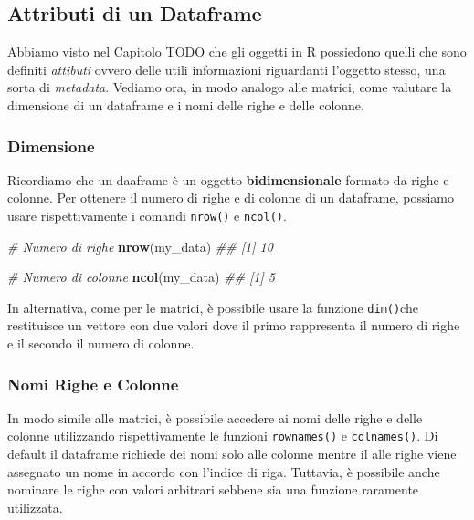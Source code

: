 \documentclass[
]{book}
\newenvironment{Shaded}{\begin{snugshade}}{\end{snugshade}}
\newcommand{\CommentTok}[1]{\textcolor[rgb]{0.56,0.35,0.01}{\textit{#1}}}
\newcommand{\KeywordTok}[1]{\textcolor[rgb]{0.13,0.29,0.53}{\textbf{#1}}}
\newcommand{\NormalTok}[1]{#1}
\begin{document}
\hypertarget{mat-prop}{%
\subsection{Attributi di un Dataframe}\label{mat-prop}}

Abbiamo visto nel Capitolo TODO che gli oggetti in R possiedono quelli che sono definiti \emph{attibuti} ovvero delle utili informazioni riguardanti l'oggetto stesso, una sorta di \emph{metadata}. Vediamo ora, in modo analogo alle matrici, come valutare la dimensione di un dataframe e i nomi delle righe e delle colonne.

\hypertarget{dimensione-1}{%
\subsubsection*{Dimensione}\label{dimensione-1}}

Ricordiamo che un daaframe è un oggetto \textbf{bidimensionale} formato da righe e colonne. Per ottenere il numero di righe e di colonne di un dataframe, possiamo usare rispettivamente i comandi \texttt{nrow()} e \texttt{ncol()}.

\begin{Shaded}
\begin{Highlighting}[]
\CommentTok{# Numero di righe}
\KeywordTok{nrow}\NormalTok{(my_data)}
\CommentTok{## [1] 10}

\CommentTok{# Numero di colonne}
\KeywordTok{ncol}\NormalTok{(my_data)}
\CommentTok{## [1] 5}
\end{Highlighting}
\end{Shaded}

In alternativa, come per le matrici, è possibile usare la funzione \texttt{dim()}che restituisce un vettore con due valori dove il primo rappresenta il numero di righe e il secondo il numero di colonne.

\hypertarget{nomi-righe-e-colonne-1}{%
\subsubsection*{Nomi Righe e Colonne}\label{nomi-righe-e-colonne-1}}

In modo simile alle matrici, è possibile accedere ai nomi delle righe e delle colonne utilizzando rispettivamente le funzioni \texttt{rownames()} e \texttt{colnames()}. Di default il dataframe richiede dei nomi solo alle colonne mentre il alle righe viene assegnato un nome in accordo con l'indice di riga. Tuttavia, è possibile anche nominare le righe con valori arbitrari sebbene sia una funzione raramente utilizzata.
\end{document}
